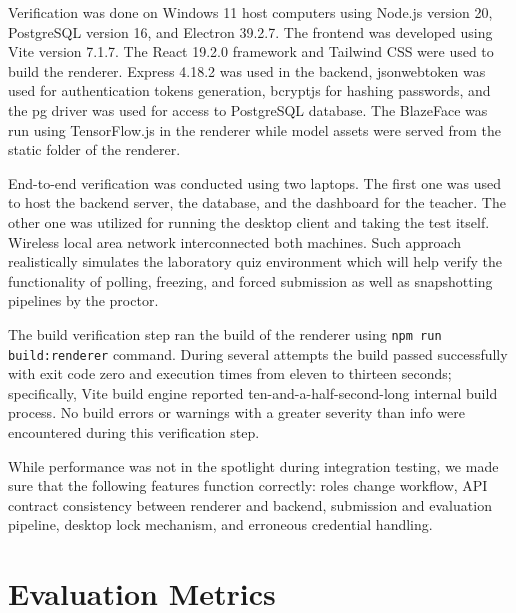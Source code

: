 \documentclass[12pt, a4paper]{report}
\begin{document}
\begin{justify}
  {\fontsize{12}{18}\selectfont
    Verification was done on Windows 11 host computers using Node.js version 20, PostgreSQL version 16, and Electron 39.2.7. The frontend was developed using Vite version 7.1.7. The React 19.2.0 framework and Tailwind CSS were used to build the renderer. Express 4.18.2 was used in the backend, jsonwebtoken was used for authentication tokens generation, bcryptjs for hashing passwords, and the pg driver was used for access to PostgreSQL database. The BlazeFace was run using TensorFlow.js in the renderer while model assets were served from the static folder of the renderer.

    End-to-end verification was conducted using two laptops. The first one was used to host the backend server, the database, and the dashboard for the teacher. The other one was utilized for running the desktop client and taking the test itself. Wireless local area network interconnected both machines. Such approach realistically simulates the laboratory quiz environment which will help verify the functionality of polling, freezing, and forced submission as well as snapshotting pipelines by the proctor.

   The build verification step ran the build of the renderer using \texttt{npm run build:renderer} command. During several attempts the build passed successfully with exit code zero and execution times from eleven to thirteen seconds; specifically, Vite build engine reported ten-and-a-half-second-long internal build process. No build errors or warnings with a greater severity than info were encountered during this verification step.

   While performance was not in the spotlight during integration testing, we made sure that the following features function correctly: roles change workflow, API contract consistency between renderer and backend, submission and evaluation pipeline, desktop lock mechanism, and erroneous credential handling.
  }
\end{justify}

\section{Evaluation Metrics}
\end{document}

